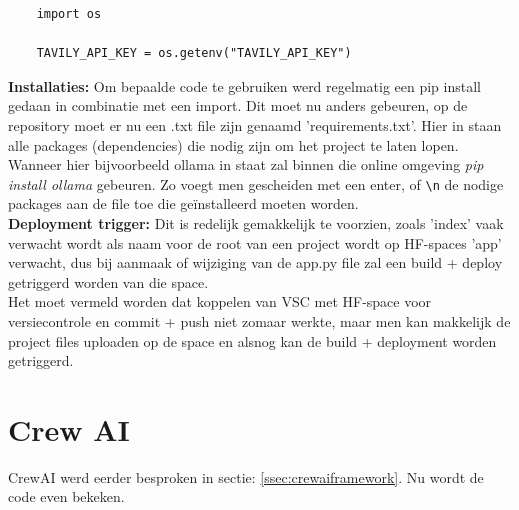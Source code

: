 \begin{verbatim}
    import os
    
    TAVILY_API_KEY = os.getenv("TAVILY_API_KEY")
\end{verbatim}

\textbf{Installaties:} Om bepaalde code te gebruiken werd regelmatig een pip install gedaan in combinatie met een import. Dit moet nu anders gebeuren, op de repository moet er nu een .txt file zijn genaamd 'requirements.txt'. Hier in staan alle packages (dependencies) die nodig zijn om het project te laten lopen. Wanneer hier bijvoorbeeld ollama in staat zal binnen die online omgeving \textit{pip install ollama} gebeuren. Zo voegt men gescheiden met een enter, of \verb|\n| de nodige packages aan de file toe die geïnstalleerd moeten worden. \\

\textbf{Deployment trigger:} Dit is redelijk gemakkelijk te voorzien, zoals 'index' vaak verwacht wordt als naam voor de root van een project wordt op HF-spaces 'app' verwacht, dus bij aanmaak of wijziging van de app.py file zal een build + deploy getriggerd worden van die space. \\

Het moet vermeld worden dat koppelen van VSC met HF-space voor versiecontrole en commit + push niet zomaar werkte, maar men kan makkelijk de project files uploaden op de space en alsnog kan de build + deployment worden getriggerd. \\




\section{Crew AI}
\label{sec:crewai}

CrewAI werd eerder besproken in sectie:  \ref{ssec:crewaiframework}. Nu wordt de code even bekeken.



